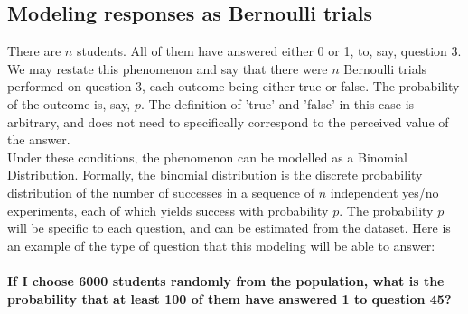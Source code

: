 \documentclass[10pt]{article}
\begin{document}
\subsection{Modeling responses as Bernoulli trials}
\label{sec:ResponsesAsBernoulliTrials}
There are $n$ students. All of them have answered either 0 or 1, to, say, question 3. We may restate this phenomenon and say that there were $n$ Bernoulli trials performed on question 3, each outcome being either true or false. The probability of the outcome is, say, $p$. The definition of 'true' and 'false' in this case is arbitrary, and does not need to specifically correspond to the perceived value of the answer.\\
Under these conditions, the phenomenon can be modelled as a Binomial Distribution. Formally, the binomial distribution is the discrete probability distribution of the number of successes in a sequence of $n$ independent yes/no experiments, each of which yields success with probability $p$.
The probability $p$ will be specific to each question, and can be estimated from the dataset.
Here is an example of the type of question that this modeling will be able to answer:\\\\
\textbf{If I choose 6000 students randomly from the population, what is the probability that at least 100 of them have answered 1 to question 45?}
\end{document}
